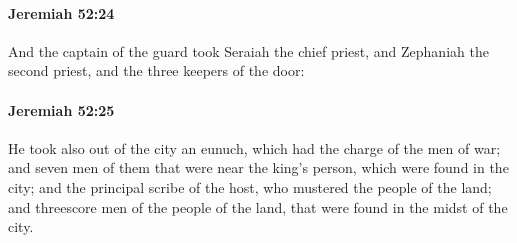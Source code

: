 		\paragraph{Jeremiah 52:24} %
			\label{JEREMIAH-52-24}

			And the captain of the guard took Seraiah the chief priest, and Zephaniah the second priest, and the three keepers of the door:


		\paragraph{Jeremiah 52:25} %
			\label{JEREMIAH-52-25}

			He took also out of the city an eunuch, which had the charge of the men of war; and seven men of them that were near the king’s person, which were found in the city; and the principal scribe of the host, who mustered the people of the land; and threescore men of the people of the land, that were found in the midst of the city.

